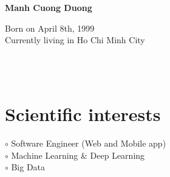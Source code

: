 \documentclass[a4paper,10pt]{article}
\begin{document}
\thispagestyle{empty}

\begin{adjustbox}{valign=t}
\begin{minipage}{0.3\textwidth} %
\begin{center}

\MySkip 	%

{\LARGE \bfseries Manh Cuong Duong}

\MySkip 	%

Born on April 8th, 1999\\
Currently living in Ho Chi Minh City\\

\MySkip 	%

\textcolor{ColorTwo}{\faEnvelopeO} 
 \\

\textcolor{ColorTwo}{\faGithub} 
\\

\textcolor{ColorTwo}{\faPhone} 
\end{center}

\vfill

\section*{Scientific interests}
\raggedright
\textcolor{ColorOne}{$\circ$} Software Engineer (Web and Mobile app)\\
\textcolor{ColorOne}{$\circ$} Machine Learning \& Deep Learning\\
\textcolor{ColorOne}{$\circ$} Big Data\\


\end{minipage}
\end{adjustbox}
\end{document}
